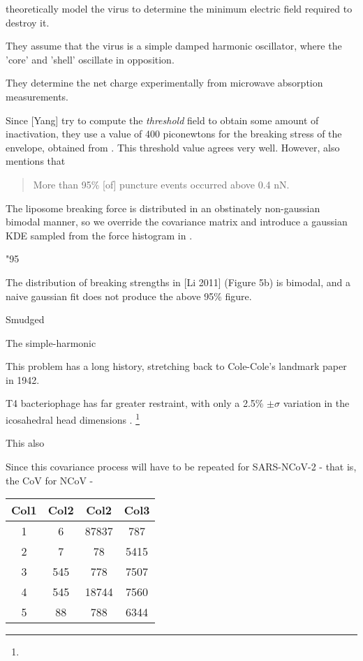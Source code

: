 \documentclass[paper.tex]{subfiles}
\begin{document}
	
	

\cite{Efficient2015} theoretically model the virus to determine the minimum electric field required to destroy it. 

They assume that the virus is a simple damped harmonic oscillator, where the 'core' and 'shell' oscillate in opposition. 

They determine the net charge experimentally from microwave absorption measurements.

Since [Yang] try to compute the {\it threshold} field to obtain some amount of inactivation, they use a value of 400 piconewtons for the breaking stress of the envelope, obtained from \cite{Bending2011}. This threshold value agrees very well. However, \cite{Bending2011} also mentions that 

\begin{quote}
	More than 95\% [of] puncture events occurred above 0.4 nN.
\end{quote}



The liposome breaking force is distributed in an obstinately non-gaussian bimodal manner, so we override the covariance matrix and introduce a gaussian KDE sampled from the force histogram in \cite{Bending2011}.



"95%

The distribution of breaking strengths in [Li 2011] (Figure 5b) is bimodal, and a naive gaussian fit does not produce the above 95\% figure.

Smudged 

The simple-harmonic

This problem has a long history, stretching back to Cole-Cole's landmark paper in 1942\cite{Dispersion1941}.

T4 bacteriophage has far greater restraint, with only a 2.5\% $\pm \sigma$ variation in the icosahedral head dimensions \cite{Head1988}. \footnote{} 

This also 

Since this covariance process will have to be repeated for SARS-NCoV-2 - that is, the CoV for NCoV - 

\begin{center}
	\begin{tabular}{||c c c c||} 
		\hline
		Col1 & Col2 & Col2 & Col3 \\ [0.5ex] 
		\hline\hline
		1 & 6 & 87837 & 787 \\ 
		\hline
		2 & 7 & 78 & 5415 \\
		\hline
		3 & 545 & 778 & 7507 \\
		\hline
		4 & 545 & 18744 & 7560 \\
		\hline
		5 & 88 & 788 & 6344 \\ [1ex] 
		\hline
	\end{tabular}
\end{center}



	
\end{document}
